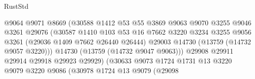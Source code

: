\begin{lexlean}{RustStd}
\begin{coremodule}
                                          @9064
                                          @9071
                                          @8669
                                          (@30588
                                            @1412
                                            @53
                                            @55
                                            @3869
                                            @9063
                                            @9070
                                            @3255
                                            @9046
                                            @3261
                                            @29076
                                            (@30587
                                              @1410
                                              @103
                                              @53
                                              @16
                                              @7662
                                              @3220
                                              @3234
                                              @3255
                                              @9056
                                              @3261
                                              (@29036 @1409 @7662 @26440 @26444)
                                              @29003
                                              @14730
                                              (@13759 (@14732 @9057 @3220)))
                                            @14730
                                            (@13759 (@14732 @9047 @9063)))
                                          @29908
                                          @29911
                                          @29914
                                          @29918
                                          @29923
                                          @29929)
                                        (@30633
                                          @9073
                                          @1724
                                          @1731
                                          @13
                                          @3220
                                          @9079
                                          @3220
                                          @9086
                                          (@30978
                                            @1724
                                            @13
                                            @9079
                                            (@29098

\end{coremodule}
\end{lexlean}
